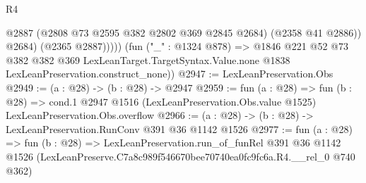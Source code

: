 \begin{lexlean}{R4}
\begin{coremodule}
                  @2887
                  (@2808 @73 @2595 @382 @2802 @369 @2845 @2684)
                  (@2358 @41 @2886))
                @2684)
              (@2365 @2887)))))
      (fun ("_" : @1324 @878) =>
      @1846
        @221
        @52
        @73
        @382
        @382
        @369
        LexLeanTarget.TargetSyntax.Value.none
        @1838
        LexLeanPreservation.construct_none))
@2947 := LexLeanPreservation.Obs
@2949 := (a : @28) -> (b : @28) -> @2947
@2959 := fun (a : @28) =>
  fun (b : @28) =>
  cond.{1} @2947 @1516 (LexLeanPreservation.Obs.value @1525) LexLeanPreservation.Obs.overflow
@2966 := (a : @28) -> (b : @28) -> LexLeanPreservation.RunConv @391 @36 @1142 @1526
@2977 := fun (a : @28) =>
  fun (b : @28) =>
  LexLeanPreservation.run_of_funRel
    @391
    @36
    @1142
    @1526
    (LexLeanPreserve.C7a8c989f546670bee70740ea0fc9fc6a.R4.__rel_0 @740 @362)
\end{coremodule}
\end{lexlean}
